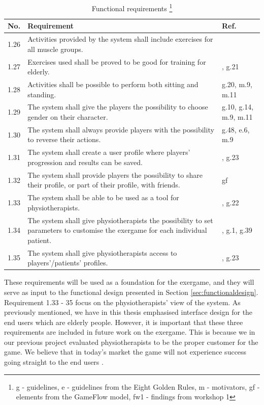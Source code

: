 \begin{minipage}{12 cm}
\begin{table} [H]
\centering
\begin{tabular}{|>{\raggedright}p{}|p{}|p{}|}
\hline
\textbf{No.} & \textbf{Requirement} & \textbf{Ref.} \\ \hline
1.26 & Activities provided by the system shall include exercises for all muscle groups. & \cite{aktivitetsbok} \\ \hline
1.27 & Exercises used shall be proved to be good for training for elderly. & \cite{project}, g.21 \\ \hline
1.28 & Activities shall be possible to perform both sitting and standing. & g.20, m.9, m.11 \\ \hline
1.29 & The system shall give the players the possibility to choose gender on their character. &  g.10, g.14, m.9, m.11 \\ \hline
1.30 & The system shall always provide players with the possibility to reverse their actions. & g.48, e.6, m.9 \\ \hline
1.31 & The system shall create a user profile where players' progression and results can be saved. & \cite{project}, g.23 \\ \hline
1.32 & The system shall provide players the possibility to share their profile, or part of their profile, with friends. &  gf \\ \hline
1.33 & The system shall be able to be used as a tool for physiotherapists. & \cite{project}, g.22 \\ \hline
1.34 & The system shall give physiotherapists the possibility to set parameters to customise the exergame for each individual patient. & \cite{project}, g.1, g.39  \\ \hline
1.35 & The system shall give physiotherapists access to players'/patients' profiles. & \cite{project}, g.23\\ \hline  
\end{tabular}
\caption[Functional requirements, part 3]{Functional requirements \footnote{g - guidelines, e - guidelines from the Eight Golden Rules, m - motivators, gf - elements from the GameFlow model, fw1 - findings from workshop 1}}
\label{tab:func3}
\end{table} 
\end{minipage}


These requirements will be used as a foundation for the exergame, and they will serve as input to the functional design presented in Section \ref{sec:functionaldesign}. Requirement 1.33 - 35 focus on the physiotherapists' view of the system. As previously mentioned, we have in this thesis emphasised interface design for the end users which are elderly people. However, it is important that these three requirements are included in future work on the exergame. This is because we in our previous project \cite{project} evaluated physiotherapists to be the proper customer for the game. We believe that in today's market the game will not experience success going straight to the end users \cite{project}.  

